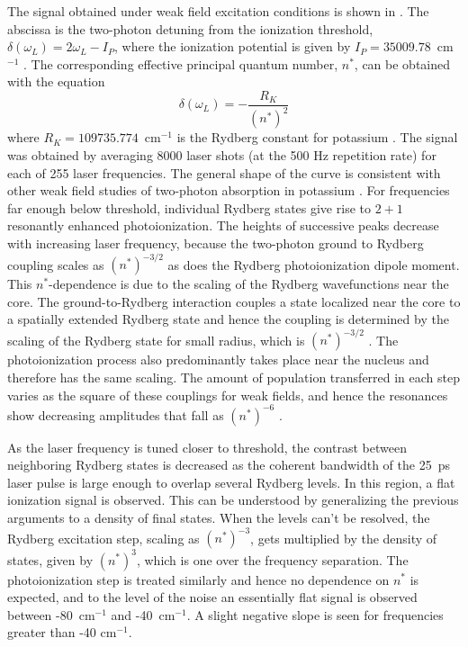 The signal obtained under weak field excitation conditions is shown in
.  The abscissa is the two-photon detuning from the ionization
threshold, $\delta(\omega_L) = 2\omega_L -I_P$, where the ionization potential
is given by $I_P = 35009.78$~cm$^{-1}$ \cite{Moore:71}.  The corresponding
effective principal quantum number, $n^*$, can be obtained with the equation
\begin{equation}
\delta(\omega_L) = -\frac{R_K}{(n^*)^2}
\end{equation}
where $R_K = 109735.774$~cm$^{-1}$ is the Rydberg constant for potassium
\cite{Gallagher_book}.  The signal was obtained by averaging 8000 laser shots
(at the 500 Hz repetition rate) for each of 255 laser frequencies.  The general
shape of the curve is consistent with other weak field studies of two-photon
absorption in potassium \cite{Harper:77,Sharma:90}.  For frequencies far enough
below threshold, individual Rydberg states give rise to $2+1$ resonantly
enhanced photoionization.  The heights of successive peaks decrease with
increasing laser frequency,  because the two-photon ground to
Rydberg coupling scales as $(n^*)^{-3/2}$ as does the Rydberg photoionization
dipole moment.  This $n^*$-dependence is due to the scaling of the Rydberg
wavefunctions near the core.  The ground-to-Rydberg interaction couples a state
localized near the core to a spatially extended Rydberg state and hence the
coupling is determined by the scaling of the Rydberg state for small radius,
which is $(n^*)^{-3/2}$ \cite{Gallagher_book}.  The photoionization process also
predominantly takes place near the nucleus \cite{Alber:88} and therefore has
the same scaling.  The amount of population transferred in each step varies as
the square of these couplings for weak fields, and hence the resonances show
decreasing amplitudes that fall as $(n^*)^{-6}$ \cite{Gratl:89}.

As the laser frequency is tuned closer to threshold, the contrast between
neighboring Rydberg states is decreased as the coherent bandwidth of the 25~ps
laser pulse is large enough to overlap several Rydberg levels.  In this region,
a flat ionization signal is observed.  This can be understood by generalizing
the previous arguments to a density of final states.  When the levels can't be
resolved, the Rydberg excitation step, scaling as $(n^*)^{-3}$, gets multiplied
by the density of states, given by $(n^*)^{3}$, which is one over the frequency
separation.  The photoionization step is treated similarly and hence no
dependence on $n^*$ is expected, and to the level of the noise an essentially
flat signal is observed between -80~cm$^{-1}$ and -40~cm$^{-1}$.  A slight
negative slope is seen for frequencies greater than -40 cm$^{-1}$.

